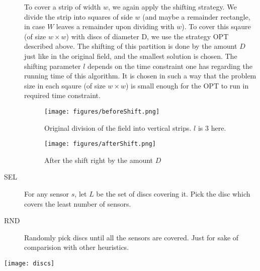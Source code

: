 \begin{description}
To cover a strip of width $w$, we again apply the shifting strategy. We divide the strip into squares of side $w$ (and maybe a remainder rectangle, in case $W$ leaves a remainder upon dividing with $w$). To cover this sqaure (of size $w \times w$) with discs of diameter D, we use the strategy OPT described above. The shifting of this partition is done by the amount $D$ just like in the original field, and the smallest solution is chosen. The shifting parameter $l$ depends on the time constraint one has regarding the running time of this algorithm. It is chosen in such a way that the problem size in each sqaure (of size $w \times w$) is small enough for the OPT to run in required time constraint.

\begin{figure}[H]

\texttt{[image: figures/beforeShift.png]}
\caption{Original division of the field into vertical strips. $l$ is 3 here.} \label{fig:origStrip}

\end{figure}

\begin{figure}[H]

\texttt{[image: figures/afterShift.png]}

\caption{After the shift right by the amount $D$}\label{fig:shiftStrip}

\end{figure}

\item[SEL] For any sensor $s$, let $L$ be the set of discs covering it. Pick the disc which covers the least number of sensors.
\item[RND] Randomly pick discs until all the sensors are covered. Just for sake of comparision with other heuristics.
\end{description}

\texttt{[image: discs]}